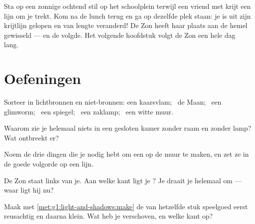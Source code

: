 \begin{example}\label{ex:g1:light-and-shadows:chalk}
Sta op een zonnige ochtend stil op het schoolplein terwijl een vriend
met krijt een lijn om je  trekt. Kom na de lunch terug en ga
op dezelfde plek staan: je  is uit zijn krijtlijn gelopen en
van lengte veranderd! De Zon heeft haar plaats aan de hemel gewisseld
--- en de  volgde. Het volgende hoofdstuk volgt de Zon een
hele dag lang.
\end{example}

\section{Oefeningen}

\begin{exercise}[$\star$]\label{exo:g1:light-and-shadows:1}
Sorteer in lichtbronnen en niet-bronnen: een kaarsvlam; \ de Maan;
\ een glimworm; \ een spiegel; \ een zaklamp; \ een witte muur.
\end{exercise}

\begin{exercise}[$\star$]\label{exo:g1:light-and-shadows:2}
Waarom zie je helemaal niets in een gesloten kamer zonder raam en
zonder lamp? Wat ontbreekt er?
\end{exercise}

\begin{exercise}[$\star$]\label{exo:g1:light-and-shadows:3}
Noem de drie dingen die je nodig hebt om een  op de muur te
maken, en zet ze in de goede volgorde op een lijn.
\end{exercise}

\begin{exercise}[$\star$]\label{exo:g1:light-and-shadows:4}
De Zon staat links van je. Aan welke kant ligt je ? Je draait
je helemaal om --- waar ligt hij nu?
\end{exercise}

\begin{exercise}[$\star$]\label{exo:g1:light-and-shadows:5}
Maak met \cref{met:g1:light-and-shadows:make} de  van hetzelfde
stuk speelgoed eerst reusachtig en daarna klein. Wat heb je verschoven,
en welke kant op?
\end{exercise}

